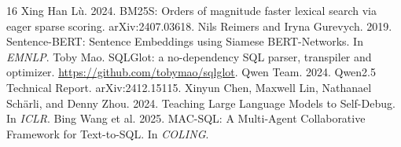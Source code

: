 \documentclass[sigconf,nonacm]{acmart}
\begin{document}
\begin{thebibliography}{16}
 Xing Han L\`u. 2024. BM25S: Orders of magnitude faster lexical search via eager sparse scoring. arXiv:2407.03618.
 Nils Reimers and Iryna Gurevych. 2019. Sentence-BERT: Sentence Embeddings using Siamese BERT-Networks. In \emph{EMNLP}.
 Toby Mao. SQLGlot: a no-dependency SQL parser, transpiler and optimizer. \url{https://github.com/tobymao/sqlglot}.
 Qwen Team. 2024. Qwen2.5 Technical Report. arXiv:2412.15115.
 Xinyun Chen, Maxwell Lin, Nathanael Sch\"arli, and Denny Zhou. 2024. Teaching Large Language Models to Self-Debug. In \emph{ICLR}.
 Bing Wang et al. 2025. MAC-SQL: A Multi-Agent Collaborative Framework for Text-to-SQL. In \emph{COLING}.
\end{thebibliography}
\end{document}
